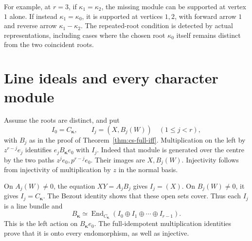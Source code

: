 For example, at \(r=3\), if \(\kappa_1=\kappa_2\), the missing
module can be supported at vertex \(1\) alone. If instead
\(\kappa_1=\kappa_0\), it is supported at vertices \(1,2\), with
forward arrow \(1\) and reverse arrow \(\kappa_1-\kappa_2\).
The repeated-root condition is detected by actual representations,
including cases where the chosen root \(\kappa_0\) itself remains
distinct from the two coincident roots.

\section{Line ideals and every character module}

Assume the roots are distinct, and put
\[
 I_0=C_{\boldsymbol\kappa},\qquad
 I_j=(X,B_j(W))\quad(1\leq j<r),
\]
with \(B_j\) as in the proof of Theorem~\ref{thm:cs-full-iff}.
Multiplication on the left by \(z^{r-j}e_j\) identifies
\(e_jB_{\boldsymbol\kappa}e_0\) with \(I_j\).
Indeed that module is generated over the centre by the two paths
\(z^je_0,p^{r-j}e_0\). Their images are \(X,B_j(W)\).
Injectivity follows from injectivity of multiplication by \(z\)
in the normal basis.

On \(A_j(W)\ne0\), the equation \(XY=A_jB_j\) gives \(I_j=(X)\).
On \(B_j(W)\ne0\), it gives \(I_j=C_{\boldsymbol\kappa}\).
The Bezout identity shows that these open sets cover.
Thus each \(I_j\) is a line bundle and
\begin{equation}\label{eq:cs-all-bundle}
 B_{\boldsymbol\kappa}\simeq
 \operatorname{End}_{C_{\boldsymbol\kappa}}
       (I_0\oplus I_1\oplus\cdots\oplus I_{r-1}).
\end{equation}
This is the left action on \(B_{\boldsymbol\kappa}e_0\).
The full-idempotent multiplication identities prove that it is
onto every endomorphism, as well as injective.

